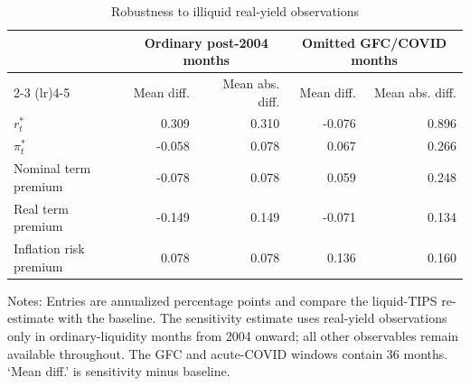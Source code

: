 \begin{table}[H]
\centering
\caption{Robustness to illiquid real-yield observations}
\label{tab:liquid_tips_robustness}
\begin{threeparttable}
\small
\begin{tabular*}{\textwidth}{@{\extracolsep{\fill}}lrrrr}
\toprule
 & \multicolumn{2}{c}{Ordinary post-2004 months} & \multicolumn{2}{c}{Omitted GFC/COVID months} \\
\cmidrule(lr){2-3} \cmidrule(lr){4-5}
 & Mean diff. & Mean abs. diff. & Mean diff. & Mean abs. diff. \\
\midrule
$r_t^*$ & 0.309 & 0.310 & -0.076 & 0.896 \\
$\pi_t^*$ & -0.058 & 0.078 & 0.067 & 0.266 \\
Nominal term premium & -0.078 & 0.078 & 0.059 & 0.248 \\
Real term premium & -0.149 & 0.149 & -0.071 & 0.134 \\
Inflation risk premium & 0.078 & 0.078 & 0.136 & 0.160 \\
\bottomrule
\end{tabular*}
\begin{tablenotes}[flushleft]
\footnotesize
\item Notes: Entries are annualized percentage points and compare the liquid-TIPS re-estimate with the baseline. The sensitivity estimate uses real-yield observations only in ordinary-liquidity months from 2004 onward; all other observables remain available throughout. The GFC and acute-COVID windows contain 36 months. `Mean diff.' is sensitivity minus baseline.
\end{tablenotes}
\end{threeparttable}
\end{table}
